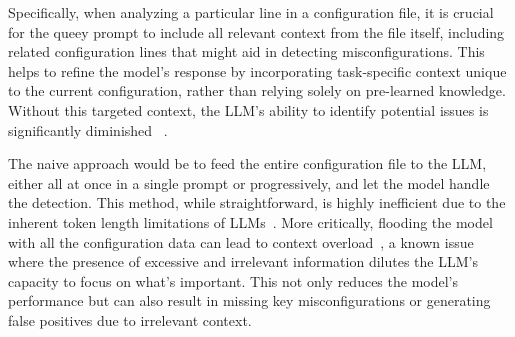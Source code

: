 
Specifically, when analyzing a particular line in a configuration file, it is crucial for the queey prompt to include all relevant context from the file itself, including related configuration lines that might aid in detecting misconfigurations. This helps to refine the model's response by incorporating task-specific context unique to the current configuration, rather than relying solely on pre-learned knowledge. Without this targeted context, the LLM's ability to identify potential issues is significantly diminished ~\cite{liskavets2024prompt,tian2024examining,khurana2024and, shvartzshnaider2024llm}.

The naive approach would be to feed the entire configuration file to the LLM, either all at once in a single prompt or progressively, and let the model handle the detection. This method, while straightforward, is highly inefficient due to the inherent token length limitations of LLMs~\cite{xue2024repeat,yu2024breaking,gu2023mamba}. More critically, flooding the model with all the configuration data can lead to context overload~\cite{lican,li2024long,qian2024long}, a known issue where the presence of excessive and irrelevant information dilutes the LLM’s capacity to focus on what’s important. This not only reduces the model’s performance but can also result in missing key misconfigurations or generating false positives due to irrelevant context. 

